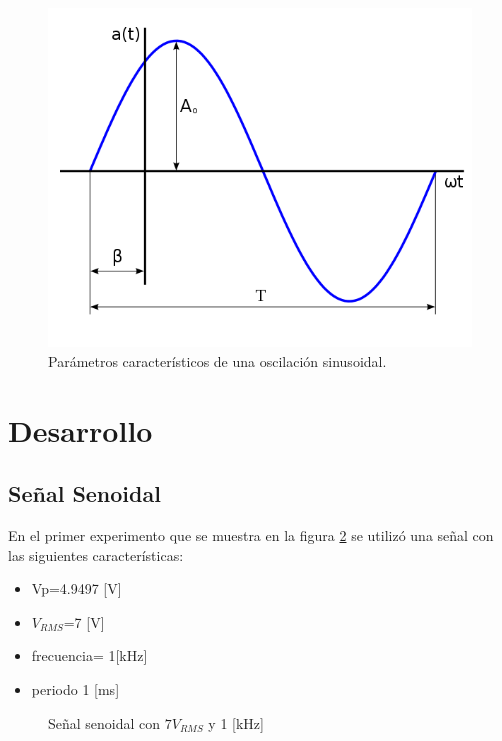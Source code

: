\documentclass{article}
\begin{document}
\begin{figure}[ht!]
    \centering
    \includegraphics[scale=0.5]{Imagenes/600px-OndaSenoidal.png}
    \caption{Parámetros característicos de una oscilación sinusoidal.}
    \label{fig:ondaSenoidal}
\end{figure}


\section{Desarrollo}

\subsection{Señal Senoidal}

En el primer experimento que se muestra en la figura \ref{Seno7RMS} se utilizó una señal con las siguientes características:\\

\begin{itemize}
    \item Vp=4.9497 [V]
    \item $V_{RMS}$=7 [V]
    \item frecuencia= 1[kHz]
    \item periodo 1 [ms]
\end{itemize}

\begin{figure}[h!]
    \centering

\caption{Señal senoidal con $7 V_{RMS}
$ y 1 [kHz]}
\label{Seno7RMS}
\end{figure}
\end{document}
